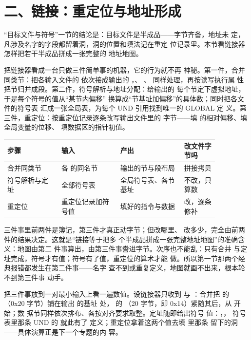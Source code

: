 \section{二、链接：重定位与地址形成}

“目标文件与符号”一节的结论是：目标文件是半成品——字节齐备，地址未
定，凡涉及名字的字段都留着洞，洞的位置和填法记在重定
位记录里。本节看链接器怎样把若干半成品拼成一张完整的
地址地图。

把链接器看成一台只做三件简单事的机器，它的行为就不再
神秘。第一件，合并同类节：把各输入文件的 
依次接成输出的 ，、
、 同样处理，再按读写执行属
性把节归并成段。第二件，符号解析与地址分配：给输出的
每个节定下虚拟地址，于是每个符号的值从“某节内偏移”
换算成“节基址加偏移”的具体数；同时把各文件的符号表
汇成一张全局表，为每个 UND 引用找到唯一的 GLOBAL 定
义。第三件，重定位：按重定位记录逐条改写输出文件里的
字节——填  的相对偏移、填全局变量的位移、
填数据区的指针初值。

\begin{longtable}{L{0.22\linewidth}L{0.24\linewidth}L{0.26\linewidth}L{0.14\linewidth}}
\toprule
步骤 & 输入 & 产出 & 改文件字节吗 \\
\midrule
合并同类节 & 各  的同名节 & 输出的节与段布局 & 拼接拷贝 \\\tablerowrule
符号解析与定址 & 全部符号表 & 全局符号表、各节基址 & 不改，只算数 \\\tablerowrule
重定位 & 重定位记录加符号值 & 填好的指令与数据 & 改，逐条修补 \\
\bottomrule
\end{longtable}

三件事里前两件是簿记，第三件才真正动字节；但改哪里、
改多少，完全由前两件的结果决定。这就是“链接等于把多
个半成品拼成一张完整地址地图”的准确含义：地图由第二
件事算出，由第三件事誊进字节。次序也不能乱：只有合并
与定址完成，符号才有值；符号有了值，重定位的算术才能
做。所以第一节那两个经典报错都发生在第二件事——名字
查不到或重复定义，地图就画不出来，根本轮不到第三件事
动手。

把三件事放到一对最小输入上看一遍数值。设链接器只收到
 与 ：合并把  的
（0x20 字节）铺在输出  的基址
 处， 的 （20
字节，即 0x14）紧随其后，从  开始；数
据节同样依次排布、各按对齐要求取整。定址随即给出符号
值：，，
 符号表里那条 UND 的  就此有了
定义；重定位拿着这两个值去填  里那条
 留下的洞——具体演算正是下一个专题的内
容。


